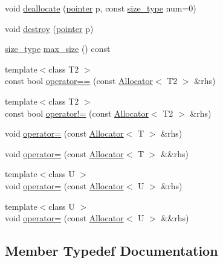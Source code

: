 \begin{DoxyCompactItemize}
\item 
void \hyperlink{classprism_1_1_allocator_aca700b82234799c7a1e90e89d40f7445}{deallocate} (\hyperlink{classprism_1_1_allocator_ad3c6706a7243bd3ef489e16d34d5750f}{pointer} p, const \hyperlink{classprism_1_1_allocator_a47cb9435e4e9ff4c934ea3d4b4338d52}{size\+\_\+type} num=0)
\item 
void \hyperlink{classprism_1_1_allocator_a660832107a9bc094324adf9da718fa43}{destroy} (\hyperlink{classprism_1_1_allocator_ad3c6706a7243bd3ef489e16d34d5750f}{pointer} p)
\item 
\hyperlink{classprism_1_1_allocator_a47cb9435e4e9ff4c934ea3d4b4338d52}{size\+\_\+type} \hyperlink{classprism_1_1_allocator_adc3d03562ab64759d8a48a191ff344d8}{max\+\_\+size} () const 
\item 
{\footnotesize template$<$class T2 $>$ }\\const bool \hyperlink{classprism_1_1_allocator_a6e4d64dc74ef98bae3cb13eef532116c}{operator==} (const \hyperlink{classprism_1_1_allocator}{Allocator}$<$ T2 $>$ \&rhs)
\item 
{\footnotesize template$<$class T2 $>$ }\\const bool \hyperlink{classprism_1_1_allocator_aa1b7baa61a8e3938861dc0e9e9d369a5}{operator!=} (const \hyperlink{classprism_1_1_allocator}{Allocator}$<$ T2 $>$ \&rhs)
\item 
void \hyperlink{classprism_1_1_allocator_a58dd5e4718b753f0e64b1d9c00089b46}{operator=} (const \hyperlink{classprism_1_1_allocator}{Allocator}$<$ T $>$ \&rhs)
\item 
void \hyperlink{classprism_1_1_allocator_ae35090442e453eec485e61afd3959a04}{operator=} (const \hyperlink{classprism_1_1_allocator}{Allocator}$<$ T $>$ \&\&rhs)
\item 
{\footnotesize template$<$class U $>$ }\\void \hyperlink{classprism_1_1_allocator_ae723165ce5bf6f080ec58f45e16acf5c}{operator=} (const \hyperlink{classprism_1_1_allocator}{Allocator}$<$ U $>$ \&rhs)
\item 
{\footnotesize template$<$class U $>$ }\\void \hyperlink{classprism_1_1_allocator_a17b523e405b81ddc67a68b028c4d5da9}{operator=} (const \hyperlink{classprism_1_1_allocator}{Allocator}$<$ U $>$ \&\&rhs)
\end{DoxyCompactItemize}


\subsection{Member Typedef Documentation}
